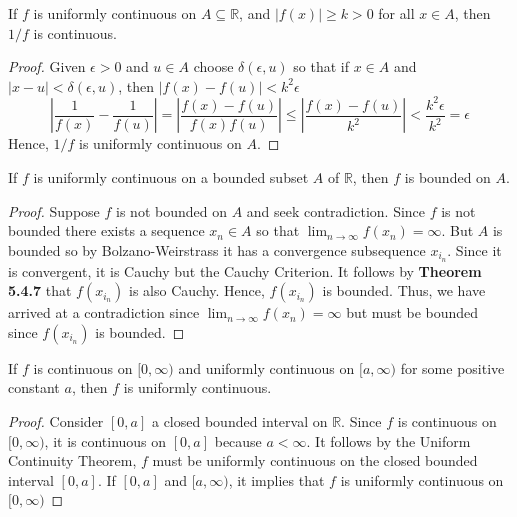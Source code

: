 \documentclass[12pt]{article}
\newcommand{\R}{\mathbb{R}}
\newenvironment{claim}[2][Claim]{\begin{trivlist}
		\item[\hskip \labelsep {\bfseries #1}\hskip \labelsep {\bfseries #2}]}{\end{trivlist}}
\begin{document}
\begin{claim}{5.4.9}
	If $f$ is uniformly continuous on $A \subseteq \R$, and $|f(x)| \geq k > 0$ for all $x \in A$, then $1/f$ is continuous.
\end{claim}
\begin{proof}
	Given $\epsilon > 0$ and $u \in A$ choose $\delta(\epsilon, u)$ so that if $x \in A$ and $| x - u| < \delta(\epsilon, u)$, then $|f(x) - f(u)| < k^2 \epsilon$ 
	\[
		\left | \frac{1}{f(x)} - \frac{1}{f(u)} \right | = \left |\frac{f(x) - f(u)}{f(x)f(u)} \right | \leq \left | \frac{f(x) - f(u)}{k^2} \right |  < \frac{k^2 \epsilon}{k^2} = \epsilon
	\]
	Hence, $1/f$ is uniformly continuous on $A$.
\end{proof}
\begin{claim}{5.4.10}
	If $f$ is uniformly continuous on a bounded subset $A$ of $\R$, then $f$ is bounded on $A$. 
\end{claim}
\begin{proof}
	Suppose $f$ is not bounded on $A$ and seek contradiction. Since $f$ is not bounded there exists a sequence $x_n \in A$ so that $\lim_{n \rightarrow \infty} f(x_n) = \infty$. But $A$ is bounded so by Bolzano-Weirstrass it has  a convergence subsequence $x_{i_n}$. Since it is convergent, it is Cauchy but the Cauchy Criterion. It follows by \textbf{Theorem 5.4.7} that $f(x_{i_n})$ is also Cauchy. Hence, $f(x_{i_n})$ is bounded. Thus, we have arrived at a contradiction since $\lim_{n \rightarrow \infty} f(x_n) = \infty$ but must be bounded since $f(x_{i_n})$ is bounded. 
\end{proof}
\begin{claim}{5.4.12}
	If $f$ is continuous on $[0, \infty)$ and uniformly continuous on $[a, \infty)$ for some positive constant $a$, then $f$ is uniformly continuous.
\end{claim}
\begin{proof}
	Consider $[0,a]$ a closed bounded interval on $\R$. Since $f$ is continuous on $[0, \infty)$, it is continuous on $[0, a]$ because $a < \infty$. It follows by the Uniform Continuity Theorem, $f$ must be uniformly continuous on the closed bounded interval $[0, a]$. If $[0, a]$ and $[a, \infty)$, it implies that $f$ is uniformly continuous on $[0, \infty)$
\end{proof}
\end{document}

